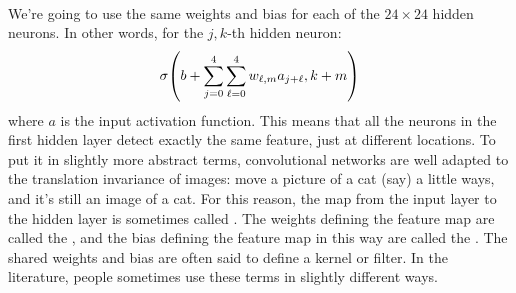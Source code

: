 {\paragraph{} We're going to use the same weights and bias for each of the $24\times24$ hidden neurons. In other words, for the $j,k$-th hidden neuron:
\begin{equation}
\sigma \br{b+\sum_{j=0}^4\sum_{\ell=0}^4 w_{\ell, m} a_{j+\ell}, k+m}
\label{eq1:CNN}
\end{equation}
where $a$ is the input activation function. This means that all the neurons in the first hidden layer detect exactly the same feature, just at different locations. To put it in slightly more abstract terms, convolutional networks are well adapted to the translation invariance of images: move a picture of a cat (say) a little ways, and it's still an image of a cat. For this reason, the map from the input layer to the hidden layer is sometimes called . The weights defining the feature map are called the , and the bias defining the feature map in this way are called the . The shared weights and bias are often said to define a kernel or filter. In the literature, people sometimes use these terms in slightly different ways.

}
